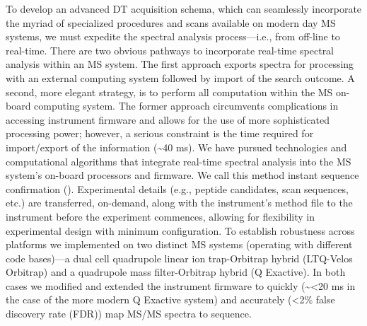 To develop an advanced DT acquisition schema, which can seamlessly incorporate the myriad of specialized procedures and scans available on modern day MS systems, we must expedite the spectral analysis process---i.e., from off-line to real-time. There are two obvious pathways to incorporate real-time spectral analysis within an MS system. The first approach exports spectra for processing with an external computing system followed by import of the search outcome.\cite{mqrt} A second, more elegant strategy, is to perform all computation within the MS on-board computing system.\cite{transform} The former approach circumvents complications in accessing instrument firmware and allows for the use of more sophisticated processing power; however, a serious constraint is the time required for import/export of the information (\textasciitilde40 ms). We have pursued technologies and computational algorithms that integrate real-time spectral analysis into the MS system's on-board processors and firmware. We call this method instant sequence confirmation (\inseq{}). Experimental details (e.g., peptide candidates, scan sequences, etc.) are transferred, on-demand, along with the instrument's method file to the instrument before the experiment commences, allowing for flexibility in experimental design with minimum configuration. To establish robustness across platforms we implemented \inseq{} on two distinct MS systems (operating with different code bases)---a dual cell quadrupole linear ion trap-Orbitrap hybrid (LTQ-Velos Orbitrap) and a quadrupole mass filter-Orbitrap hybrid (Q Exactive). In both cases we modified and extended the instrument firmware to quickly (\textasciitilde<20 ms in the case of the more modern Q Exactive system) and accurately (<2\% false discovery rate (FDR)) map MS/MS spectra to sequence.
